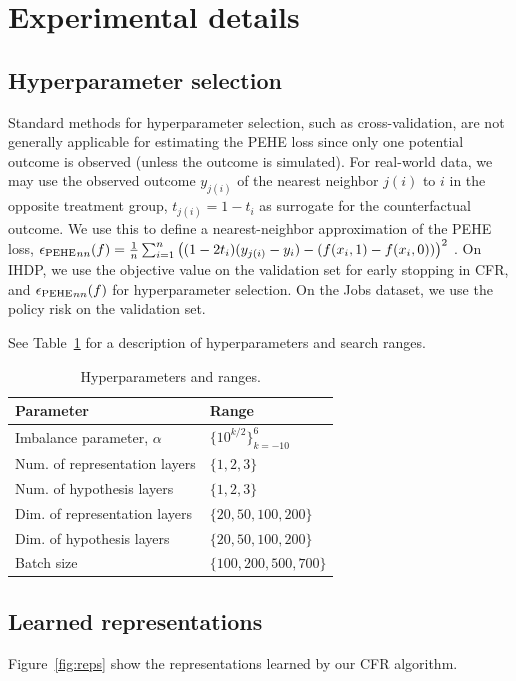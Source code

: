 \section{Experimental details}\label{sec:appexp}

\subsection{Hyperparameter selection}
Standard methods for hyperparameter selection, such as cross-validation, are not generally applicable for estimating the PEHE loss since only one potential outcome is observed (unless the outcome is simulated). For real-world data, we may use the observed outcome $y_{j(i)}$ of the nearest neighbor $j(i)$ to $i$ in the opposite treatment group, $t_{j(i)} = 1 - t_i$ as surrogate for the counterfactual outcome. We use this to define a nearest-neighbor approximation of the PEHE loss, ${\epsilon_{\text{PEHE}}}_{nn}(f) = \frac{1}{n}\sum_{i=1}^n \left((1-2t_i)(y_{j(i)} - y_i) - (f(x_i,1) - f(x_i,0))\right)^2~$. On IHDP, we use the objective value on the validation set for early stopping in CFR, and ${\epsilon_{\text{PEHE}}}_{nn}(f)$ for hyperparameter selection. On the Jobs dataset, we use the policy risk on the validation set.

See Table~\ref{tbl:hypparams} for a description of hyperparameters and search ranges.

\begin{table}[t!]
  \caption{\label{tbl:hypparams}Hyperparameters and ranges.}
  \begin{center}
      \begin{tabular}{ll}
        Parameter & Range \\ \hline
        Imbalance parameter, $\alpha$ & $\{10^{k/2}\}_{k=-10}^6$ \\
        Num. of representation layers & $\{1,2,3\}$ \\
        Num. of hypothesis layers & $\{1,2,3\}$ \\
        Dim. of representation layers & $\{20, 50, 100, 200\}$ \\
        Dim. of hypothesis layers & $\{20, 50, 100, 200\}$ \\
        Batch size & $\{100, 200, 500, 700\}$ \\
        \hline
      \end{tabular}
    \end{center}
\end{table}

\subsection{Learned representations}
Figure~\ref{fig:reps} show the representations learned by our CFR algorithm.




